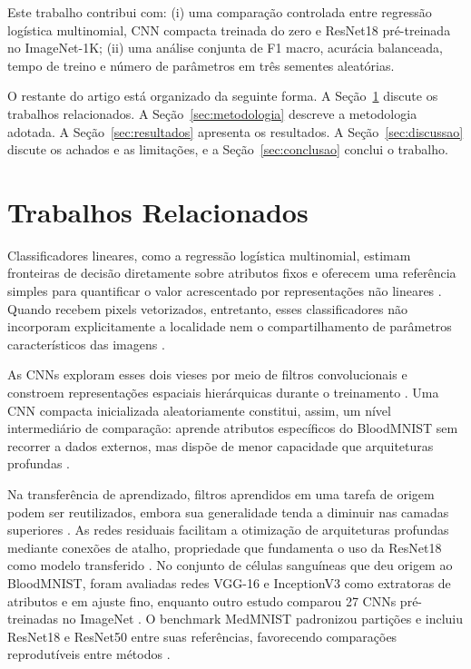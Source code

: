 \documentclass[conference]{IEEEtran}
\begin{document}
Este trabalho contribui com: (i) uma comparação controlada entre regressão logística multinomial, CNN compacta treinada do zero e ResNet18 pré-treinada no ImageNet-1K; (ii) uma análise conjunta de F1 macro, acurácia balanceada, tempo de treino e número de parâmetros em três sementes aleatórias.

O restante do artigo está organizado da seguinte forma.
A Seção~\ref{sec:trabalhos} discute os trabalhos relacionados.
A Seção~\ref{sec:metodologia} descreve a metodologia adotada.
A Seção~\ref{sec:resultados} apresenta os resultados.
A Seção~\ref{sec:discussao} discute os achados e as limitações, e a Seção~\ref{sec:conclusao} conclui o trabalho.

\section{Trabalhos Relacionados}
\label{sec:trabalhos}

Classificadores lineares, como a regressão logística multinomial, estimam fronteiras de decisão diretamente sobre atributos fixos e oferecem uma referência simples para quantificar o valor acrescentado por representações não lineares \cite{bohning1992multinomial,goodfellow2016deep}.
Quando recebem pixels vetorizados, entretanto, esses classificadores não incorporam explicitamente a localidade nem o compartilhamento de parâmetros característicos das imagens \cite{goodfellow2016deep,lecun2015deep}.

As CNNs exploram esses dois vieses por meio de filtros convolucionais e constroem representações espaciais hierárquicas durante o treinamento \cite{lecun2015deep}.
Uma CNN compacta inicializada aleatoriamente constitui, assim, um nível intermediário de comparação: aprende atributos específicos do BloodMNIST sem recorrer a dados externos, mas dispõe de menor capacidade que arquiteturas profundas \cite{goodfellow2016deep,lecun2015deep}.

Na transferência de aprendizado, filtros aprendidos em uma tarefa de origem podem ser reutilizados, embora sua generalidade tenda a diminuir nas camadas superiores \cite{yosinski2014transferable}.
As redes residuais facilitam a otimização de arquiteturas profundas mediante conexões de atalho, propriedade que fundamenta o uso da ResNet18 como modelo transferido \cite{he2016deep}.
No conjunto de células sanguíneas que deu origem ao BloodMNIST, foram avaliadas redes VGG-16 e InceptionV3 como extratoras de atributos e em ajuste fino, enquanto outro estudo comparou 27 CNNs pré-treinadas no ImageNet \cite{acevedo2019recognition,gavas2021deep}.
O benchmark MedMNIST padronizou partições e incluiu ResNet18 e ResNet50 entre suas referências, favorecendo comparações reprodutíveis entre métodos \cite{yang2023medmnist}.
\end{document}
